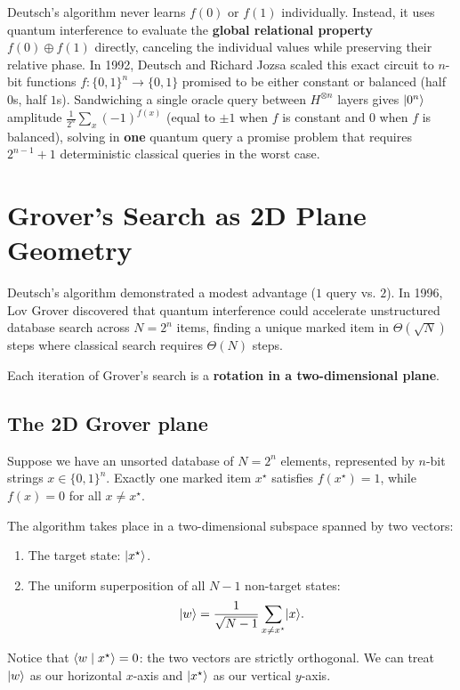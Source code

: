 Deutsch's algorithm never learns $f(0)$ or $f(1)$ individually. Instead, it
uses quantum interference to evaluate the \textbf{global relational property}
$f(0)\oplus f(1)$ directly, canceling the individual values while preserving their
relative phase. In 1992, Deutsch and Richard Jozsa scaled this exact circuit to
$n$-bit functions $f:\{0,1\}^n \to \{0,1\}$ promised to be either constant or
balanced (half $0$s, half $1$s). Sandwiching a single oracle query between $H^{\otimes n}$
layers gives $\lvert 0^n \rangle$ amplitude $\frac{1}{2^n}\sum_x (-1)^{f(x)}$ (equal to $\pm 1$
when $f$ is constant and $0$ when $f$ is balanced), solving in \textbf{one} quantum
query a promise problem that requires $2^{n-1}+1$ deterministic classical queries in
the worst case.

\section{Grover's Search as 2D Plane Geometry}
\label{ch42:grover}

Deutsch's algorithm demonstrated a modest advantage ($1$ query vs. $2$). In 1996, Lov
Grover discovered that quantum interference could accelerate unstructured database
search across $N = 2^n$ items, finding a unique marked item in $\Theta(\sqrt{N})$
steps where classical search requires $\Theta(N)$ steps.

Each iteration of Grover's search is a \textbf{rotation in a two-dimensional plane}.

\subsection{The 2D Grover plane}

Suppose we have an unsorted database of $N = 2^n$ elements, represented by $n$-bit
strings $x \in \{0, 1\}^n$. Exactly one marked item $x^\star$ satisfies $f(x^\star) = 1$,
while $f(x) = 0$ for all $x \ne x^\star$.

The algorithm takes place in a two-dimensional subspace spanned by two vectors:
\begin{enumerate}
  \item The target state: $\lvert x^\star \rangle$.
  \item The uniform superposition of all $N-1$ non-target states:
  \[
    \lvert w \rangle = \frac{1}{\sqrt{N-1}}\sum_{x \ne x^\star}\lvert x \rangle.
  \]
\end{enumerate}
Notice that $\langle w \mid x^\star \rangle = 0$: the two vectors are strictly orthogonal. We can
treat $\lvert w \rangle$ as our horizontal $x$-axis and $\lvert x^\star \rangle$ as our vertical $y$-axis.

